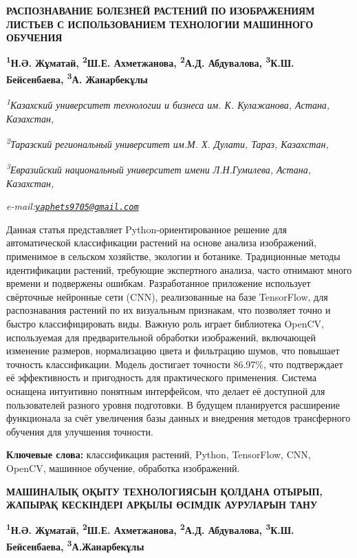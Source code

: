 \begin{articleheader}
{\bfseries РАСПОЗНАВАНИЕ БОЛЕЗНЕЙ РАСТЕНИЙ ПО ИЗОБРАЖЕНИЯМ ЛИСТЬЕВ С ИСПОЛЬЗОВАНИЕМ ТЕХНОЛОГИИ МАШИННОГО ОБУЧЕНИЯ}

{\bfseries
\textsuperscript{1}Н.Ә. Жұматай,
\textsuperscript{2}Ш.Е. Ахметжанова,
\textsuperscript{2}А.Д. Абдувалова,
\textsuperscript{3}К.Ш. Бейсенбаева,
\textsuperscript{3}А. Жанарбекұлы\textsuperscript{\envelope }}
\end{articleheader}

\begin{affiliation}
\emph{\textsuperscript{1}Казахский университет технологии и бизнеса им. К. Кулажанова, Астана, Казахстан,}

\emph{\textsuperscript{2}Таразский региональный университет им.М. Х. Дулати, Тараз, Казахстан,}

\emph{\textsuperscript{3}Евразийский национальный университет имени Л.Н.Гумилева, Астана, Казахстан,}

\emph{e-mail:\href{mailto:yaphets9705@gmail.com}{\nolinkurl{yaphets9705@gmail.com}}}
\end{affiliation}

Данная статья представляет Python-ориентированное решение для
автоматической классификации растений на основе анализа изображений,
применимое в сельском хозяйстве, экологии и ботанике. Традиционные
методы идентификации растений, требующие экспертного анализа, часто
отнимают много времени и подвержены ошибкам. Разработанное приложение
использует свёрточные нейронные сети (CNN), реализованные на базе
TensorFlow, для распознавания растений по их визуальным признакам, что
позволяет точно и быстро классифицировать виды. Важную роль играет
библиотека OpenCV, используемая для предварительной обработки
изображений, включающей изменение размеров, нормализацию цвета и
фильтрацию шумов, что повышает точность классификации. Модель достигает
точности 86.97\%, что подтверждает её эффективность и пригодность для
практического применения. Система оснащена интуитивно понятным
интерфейсом, что делает её доступной для пользователей разного уровня
подготовки. В будущем планируется расширение функционала за счёт
увеличения базы данных и внедрения методов трансферного обучения для
улучшения точности.

{\bfseries Ключевые слова:} классификация растений, Python, TensorFlow,
CNN, OpenCV, машинное обучение, обработка изображений.

\begin{articleheader}
{\bfseries МАШИНАЛЫҚ ОҚЫТУ ТЕХНОЛОГИЯСЫН ҚОЛДАНА ОТЫРЫП, ЖАПЫРАҚ КЕСКІНДЕРІ АРҚЫЛЫ ӨСІМДІК АУРУЛАРЫН ТАНУ}

{\bfseries
\textsuperscript{1}Н.Ә. Жұматай,
\textsuperscript{2}Ш.Е. Ахметжанова,
\textsuperscript{2}А.Д. Абдувалова,
\textsuperscript{3}К.Ш. Бейсенбаева,
\textsuperscript{3}А.Жанарбекұлы\textsuperscript{\envelope }}
\end{articleheader}

